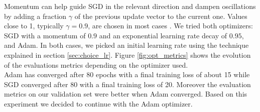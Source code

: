 \documentclass[10pt,conference,compsocconf]{IEEEtran}
\begin{document}
Momentum can help guide SGD in the relevant direction and dampen oscillations by adding a fraction $\gamma$ of the previous update vector to the current one. Values close to 1, typically $\gamma = 0.9$, are chosen in most cases \cite{optimization_algorithms, momentumvalue}. We tried both optimizers: SGD with a momentum of $0.9$ and an exponential learning rate decay of $0.95$, and Adam. In both cases, we picked an initial learning rate using the technique explained in section \ref{sec:choice_lr}. Figure \ref{fig:opt_metrics} shows the evolution of the evaluations metrics depending on the optimizer used. \\

Adam has converged after 80 epochs with a final training loss of about 15 while SGD converged after 80 with a final training loss of 20. Moreover the evaluation metrics on our validation set were better when Adam converged. Based on this experiment we decided to continue with the Adam optimizer.

\end{document}
